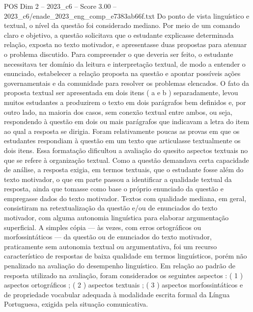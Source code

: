 \begin{textsample}{POS Dim 2 – 2023\_c6 – Score 3.00 – 2023\_c6/enade\_2023\_eng\_comp\_e7383ab66f.txt}
Do ponto de vista linguístico e textual, o nível da questão foi considerado mediano.
Por meio de um comando claro e objetivo, a questão solicitava que o estudante explicasse determinada relação, exposta no texto motivador, e apresentasse duas propostas para atenuar o problema discutido.
Para compreender o que deveria ser feito, o estudante necessitava ter domínio da leitura e interpretação textual, de modo a entender o enunciado, estabelecer a relação proposta na questão e apontar possíveis ações governamentais e da comunidade para resolver os problemas elencados.
O fato da proposta textual ser apresentada em dois itens ( a e b ) separadamente, levou muitos estudantes a produzirem o texto em dois parágrafos bem definidos e, por outro lado, na maioria dos casos, sem conexão textual entre ambos, ou seja, respondendo à questão em dois ou mais parágrafos que indicavam a letra do item ao qual a resposta se dirigia.
Foram relativamente poucas as provas em que os estudantes respondiam à questão em um texto que articulasse textualmente os dois itens.
Essa formatação dificultou a avaliação do quesito aspectos textuais no que se refere à organização textual.
Como a questão demandava certa capacidade de análise, a resposta exigia, em termos textuais, que o estudante fosse além do texto motivador, o que em parte passou a identificar a qualidade textual da resposta, ainda que tomasse como base o próprio enunciado da questão e empregasse dados do texto motivador.
Textos com qualidade mediana, em geral, consistiram na retextualização da questão e/ou de enunciados do texto motivador, com alguma autonomia linguística para elaborar argumentação superficial.
A simples cópia — às vezes, com erros ortográficos ou morfossintáticos — da questão ou de enunciados do texto motivador, praticamente sem autonomia textual ou argumentativa, foi um recurso característico de respostas de baixa qualidade em termos linguísticos, porém não penalizado na avaliação do desempenho linguístico.
Em relação ao padrão de resposta utilizado na avaliação, foram considerados os seguintes aspectos : ( 1 ) aspectos ortográficos ; ( 2 ) aspectos textuais ; ( 3 ) aspectos morfossintáticos e de propriedade vocabular adequada à modalidade escrita formal da Língua Portuguesa, exigida pela situação comunicativa.

\end{textsample}

